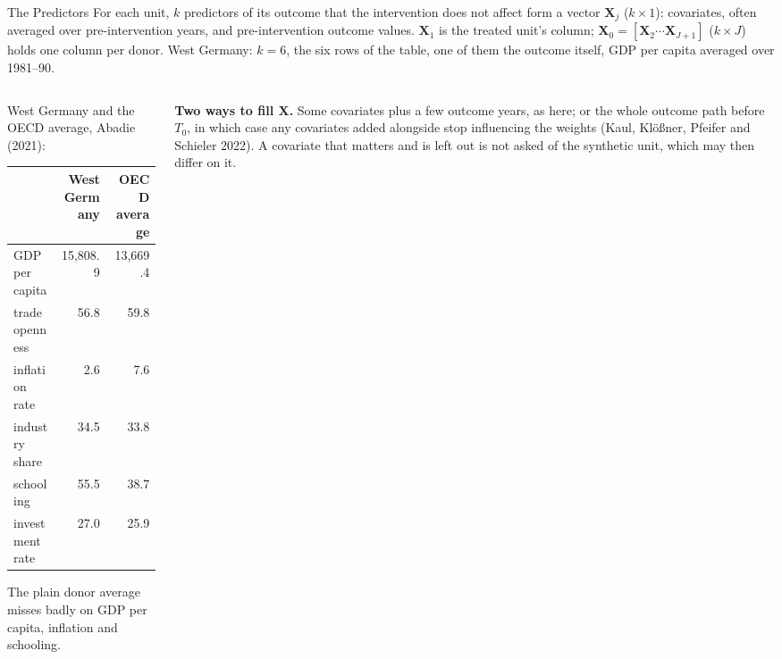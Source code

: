\documentclass[main.tex]{subfiles}
\begin{document}
\begin{frame}{The Predictors}
  \small
  For each unit, $k$ predictors of its outcome that the intervention does not
  affect form a vector $\mathbf{X}_j$ ($k \times 1$): covariates, often averaged
  over pre-intervention years, and pre-intervention outcome values.
  $\mathbf{X}_1$ is the treated unit's column; $\mathbf{X}_0 =
  [\mathbf{X}_2 \cdots \mathbf{X}_{J+1}]$ ($k \times J$) holds one column per
  donor. West Germany: $k = 6$, the six rows of the table, one of them the
  outcome itself, GDP per capita averaged over 1981--90.
  \medskip
  \begin{columns}[T]
    \begin{column}{0.46\textwidth}
      \footnotesize
      West Germany and the OECD average, Abadie (2021):
      \smallskip

      \begin{tabular}{@{}lrr@{}}
        \toprule
        & West Germany & OECD average \\
        \midrule
        GDP per capita & 15{,}808.9 & 13{,}669.4 \\
        trade openness & 56.8 & 59.8 \\
        inflation rate & 2.6 & 7.6 \\
        industry share & 34.5 & 33.8 \\
        schooling & 55.5 & 38.7 \\
        investment rate & 27.0 & 25.9 \\
        \bottomrule
      \end{tabular}
      \smallskip

      The plain donor average misses badly on GDP per capita, inflation and
      schooling.
    \end{column}
    \begin{column}{0.50\textwidth}
      \footnotesize
      \textbf{Two ways to fill $\mathbf{X}$.} Some covariates plus a few
      outcome years, as here; or the whole outcome path before $T_0$, in
      which case any covariates added alongside stop influencing the weights
      (Kaul, Klößner, Pfeifer and Schieler 2022). A covariate that matters and
      is left out is not asked of the synthetic unit, which may then differ on
      it.
    \end{column}
  \end{columns}
\end{frame}
\end{document}
